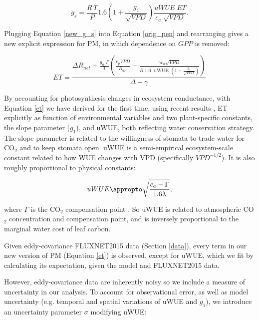   \begin{equation}
    g_s = \frac{R \, T}{P} 1.6 \left(1 + \frac{g_1}{\sqrt{VPD}}\right) \frac{uWUE \; ET}{c_a \; \sqrt{VPD}}.
    \label{new_g_s}
  \end{equation}

Plugging Equation \ref{new_g_s} into Equation \ref{orig_pen} and
rearranging gives a new explicit expression for PM, in which
dependence on $GPP$ is removed:

  \begin{equation}
    ET = \frac{\Delta R_{net} + \frac{g_a\; P}{T} \left( \frac{ c_p VPD}{R_{air}} -  \frac{\gamma c_a \sqrt{VPD} }{ R \; 1.6\; \text{ uWUE } (1 + \frac{g_1}{\sqrt{VPD}})} \right) }{ \Delta + \gamma}
    \label{et}
  \end{equation}

By accounting for photosynthesis changes in ecosystem conductance, with
Equation \ref{et} we have derived for the first time, using recent
results \citep[][]{MEDLYN_2011, Zhou_2014, Zhou_2015, Medlyn_2017}, ET
explicitly as function of environmental variables and two
plant-specific constants, the slope parameter ($g_1$), and uWUE, both
reflecting water conservation strategy. The slope parameter is related
to the willingness of stomata to trade water for CO$_2$ and to keep
stomata open. uWUE is a semi-empirical ecosystem-scale constant
related to how WUE changes with VPD (specifically $VPD^{-1/2}$). It is
also roughly proportional to physical constants:

\[uWUE \appropto \sqrt{\frac{c_a - \Gamma}{1.6 \lambda}},\]

where $\Gamma$ is the CO$_2$ compensation point \citep[Equation 5
in][]{Zhou_2014}. So uWUE is related to atmospheric CO$_2$
concentration and compensation point, and is inversely proportional to
the marginal water cost of leaf carbon.

Given eddy-covariance FLUXNET2015 data (Section \ref{data}), every
term in our new version of PM (Equation \ref{et}) is observed, except
for uWUE, which we fit by calculating its expectation, given the model
and FLUXNET2015 data.

However, eddy-covariance data are inherently noisy so we include a
measure of uncertainty in our analysis. To account for observational
error, as well as model uncertainty (e.g. temporal and spatial
variations of uWUE and $g_1$), we introduce an uncertainty parameter
$\sigma$ modifying uWUE:

